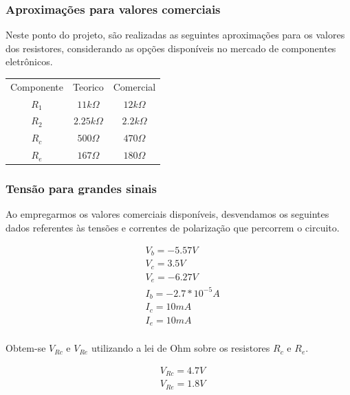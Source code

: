 \subsubsection{Aproximações para valores comerciais}

Neste ponto do projeto, são realizadas as seguintes aproximações para os valores dos resistores, considerando as opções disponíveis no mercado de componentes eletrônicos.

\begin{center}
    \begin{tabular}{ |c|c|c| }
        \hline
        Componente & Teorico            & Comercial        \\
        $R_1$      & $11k \varOmega$    & $12k \varOmega$  \\
        $R_2$      & $2.25 k \varOmega$ & $2.2k \varOmega$ \\
        $R_c$      & $500 \varOmega$    & $470 \varOmega$  \\
        $R_e$      & $167 \varOmega$    & $180 \varOmega$  \\
        \hline
    \end{tabular}
\end{center}

\subsubsection{Tensão para grandes sinais}

Ao empregarmos os valores comerciais disponíveis, desvendamos os seguintes dados referentes às tensões e correntes de polarização que percorrem o circuito.


\begin{equation}
    \begin{aligned}
         & V_b = -5.57 V         \\
         & V_c = 3.5 V           \\
         & V_e = -6.27 V         \\
         & I_b = -2.7* 10^{-5} A \\
         & I_c = 10 mA           \\
         & I_e = 10 mA           \\
    \end{aligned}
\end{equation}

Obtem-se $V_{Rc}$ e $V_{Re}$ utilizando a lei de Ohm sobre os resistores $R_c$ e $R_e$.

\begin{equation}
    \begin{aligned}
         & V_{Rc} = 4.7 V \\
         & V_{Re} = 1.8 V
    \end{aligned}
\end{equation}

